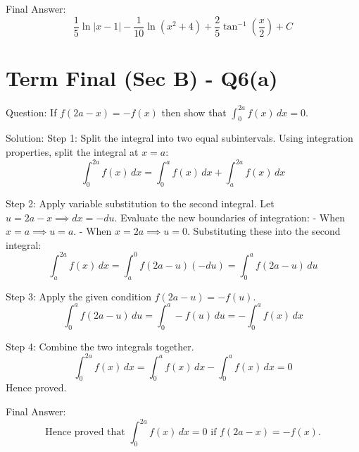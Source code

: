 \documentclass{article}
\begin{document}
Final Answer:
\[
\boxed{\frac{1}{5} \ln|x-1| - \frac{1}{10} \ln(x^2+4) + \frac{2}{5} \tan^{-1}\left(\frac{x}{2}\right) + C}
\]

\section*{Term Final (Sec B) - Q6(a)}
Question:
If \(f(2a-x) = -f(x)\) then show that \(\int_0^{2a} f(x) \, dx = 0\).

Solution:
Step 1: Split the integral into two equal subintervals.
Using integration properties, split the integral at \(x = a\):
\[
\int_0^{2a} f(x) \, dx = \int_0^a f(x) \, dx + \int_a^{2a} f(x) \, dx
\]

Step 2: Apply variable substitution to the second integral.
Let \(u = 2a - x \implies dx = -du\).
Evaluate the new boundaries of integration:
- When \(x = a \implies u = a\).
- When \(x = 2a \implies u = 0\).
Substituting these into the second integral:
\[
\int_a^{2a} f(x) \, dx = \int_a^0 f(2a-u) (-du) = \int_0^a f(2a-u) \, du
\]

Step 3: Apply the given condition \(f(2a-u) = -f(u)\).
\[
\int_0^a f(2a-u) \, du = \int_0^a -f(u) \, du = -\int_0^a f(x) \, dx
\]

Step 4: Combine the two integrals together.
\[
\int_0^{2a} f(x) \, dx = \int_0^a f(x) \, dx - \int_0^a f(x) \, dx = 0
\]
Hence proved.

Final Answer:
\[
\text{Hence proved that } \boxed{\int_0^{2a} f(x) \, dx = 0} \text{ if } f(2a-x) = -f(x).
\]

\end{document}
